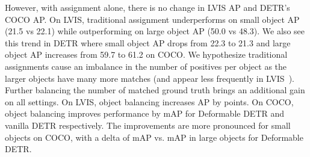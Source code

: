 \documentclass[10pt,twocolumn,letterpaper]{article}
\begin{document}
However, with assignment alone, there is no change in LVIS AP and DETR's COCO AP.
On LVIS, traditional assignment underperforms on small object AP (21.5 vs 22.1) while outperforming on large object AP (50.0 vs 48.3).
We also see this trend in DETR where small object AP drops from 22.3 to 21.3 and large object AP increases from 59.7 to 61.2 on COCO.
We hypothesize traditional assignments cause an imbalance in the number of positives per object as the larger objects have many more matches (and appear less frequently in LVIS~\cite{gupta2019lvis}).
Further balancing the number of matched ground truth brings an additional gain on all settings.
On LVIS, object balancing increases AP by  points.
On COCO, object balancing improves performance by  mAP for Deformable DETR and vanilla DETR respectively.
The improvements are more pronounced for small objects on COCO, with a delta of  mAP vs.  mAP in large objects for Deformable DETR.
\end{document}
